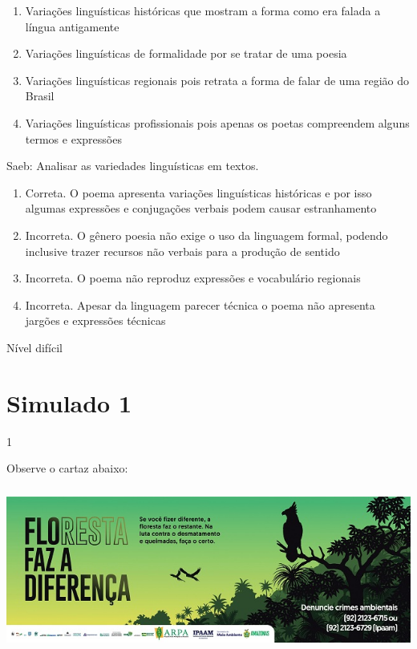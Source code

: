 {{\begin{escolha}
{\begin{itemize}
\begin{itemize}
\begin{enumerate}
\def\labelenumi{\alph{enumi})}
\item
  Variações linguísticas históricas que mostram a forma como era falada
  a língua antigamente
\item
  Variações linguísticas de formalidade por se tratar de uma poesia
\item
  Variações linguísticas regionais pois retrata a forma de falar de uma
  região do Brasil
\item
  Variações linguísticas profissionais pois apenas os poetas compreendem
  alguns termos e expressões
\end{enumerate}

Saeb: Analisar as variedades linguísticas em textos.

\begin{enumerate}
\def\labelenumi{\arabic{enumi}.}
\item
  Correta. O poema apresenta variações linguísticas históricas e por
  isso algumas expressões e conjugações verbais podem causar
  estranhamento
\item
  Incorreta. O gênero poesia não exige o uso da linguagem formal,
  podendo inclusive trazer recursos não verbais para a produção de
  sentido
\item
  Incorreta. O poema não reproduz expressões e vocabulário regionais
\item
  Incorreta. Apesar da linguagem parecer técnica o poema não apresenta
  jargões e expressões técnicas
\end{enumerate}

Nível difícil

\chapter{Simulado 1}

\num{1}

Observe o cartaz abaixo:

\includegraphics[width=5.90551in,height=2.125in]{./imgSAEB_7_POR/media/image16.png}


\end{itemize}
\end{itemize}}
\end{escolha}}}
